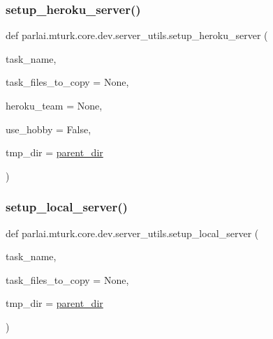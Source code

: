 \subsubsection{\texorpdfstring{setup\+\_\+heroku\+\_\+server()}{setup\_heroku\_server()}}
{\footnotesize\ttfamily def parlai.\+mturk.\+core.\+dev.\+server\+\_\+utils.\+setup\+\_\+heroku\+\_\+server (\begin{DoxyParamCaption}\item[{}]{task\+\_\+name,  }\item[{}]{task\+\_\+files\+\_\+to\+\_\+copy = {\ttfamily None},  }\item[{}]{heroku\+\_\+team = {\ttfamily None},  }\item[{}]{use\+\_\+hobby = {\ttfamily False},  }\item[{}]{tmp\+\_\+dir = {\ttfamily \hyperlink{namespaceparlai_1_1mturk_1_1core_1_1dev_1_1server__utils_a432ae14c0d872fbfebe4d9b7d73d13b9}{parent\+\_\+dir}} }\end{DoxyParamCaption})}

\mbox{\label{namespaceparlai_1_1mturk_1_1core_1_1dev_1_1server__utils_a914cced79fceeef08836d69d91e2d683}} 
\subsubsection{\texorpdfstring{setup\+\_\+local\+\_\+server()}{setup\_local\_server()}}
{\footnotesize\ttfamily def parlai.\+mturk.\+core.\+dev.\+server\+\_\+utils.\+setup\+\_\+local\+\_\+server (\begin{DoxyParamCaption}\item[{}]{task\+\_\+name,  }\item[{}]{task\+\_\+files\+\_\+to\+\_\+copy = {\ttfamily None},  }\item[{}]{tmp\+\_\+dir = {\ttfamily \hyperlink{namespaceparlai_1_1mturk_1_1core_1_1dev_1_1server__utils_a432ae14c0d872fbfebe4d9b7d73d13b9}{parent\+\_\+dir}} }\end{DoxyParamCaption})}

\mbox{\label{namespaceparlai_1_1mturk_1_1core_1_1dev_1_1server__utils_a13d7101c43eceb479444919d4e5f49fe}} 
